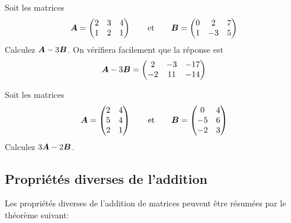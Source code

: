 \begin{exemple}
    Soit les matrices
    \[
    \boldsymbol{A} = \begin{pmatrix}
        2 & 3 & 4 \\
        1 & 2 & 1
        \end{pmatrix}
    \qquad \mbox{et} \qquad
    \boldsymbol{B} = \begin{pmatrix}
        0 & 2 & 7 \\
        1 & -3 & 5
        \end{pmatrix}
    \]
    Calculez $\boldsymbol{A}-3\boldsymbol{B}$.
    \solution
    On vérifiera facilement que la réponse est
    \[
    \boldsymbol{A} - 3\boldsymbol{B} = \begin{pmatrix}
            2 & -3 & -17 \\
            -2 & 11 & -14
            \end{pmatrix}
    \]
\end{exemple}

\begin{exerciceB}
    Soit les matrices
    \[
    \boldsymbol{A} = \begin{pmatrix}
        2 & 4 \\
        5 & 4 \\
        2 & 1
        \end{pmatrix}
    \qquad \mbox{et} \qquad
    \boldsymbol{B} = \begin{pmatrix}
        0 & 4 \\
        -5 & 6 \\
        -2 & 3
        \end{pmatrix}
    \]
    Calculez $3\boldsymbol{A}-2\boldsymbol{B}$.
\end{exerciceB}


\subsection{Propriétés diverses de l'addition}
Les propriétés diverses de l'addition de matrices peuvent être résumées
par le théorème suivant:

